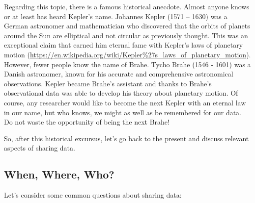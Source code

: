 \documentclass[
  11pt,
]{book}
\begin{document}
Regarding this topic, there is a famous historical anecdote. Almost anyone knows or at least has heard Kepler's name. Johannes Kepler (1571 -- 1630) was a German astronomer and mathematician who discovered that the orbits of planets around the Sun are elliptical and not circular as previously thought. This was an exceptional claim that earned him eternal fame with Kepler's laws of planetary motion (\url{https://en.wikipedia.org/wiki/Kepler\%27s_laws_of_planetary_motion}). However, fewer people know the name of Brahe. Tycho Brahe (1546 - 1601) was a Danish astronomer, known for his accurate and comprehensive astronomical observations. Kepler became Brahe's assistant and thanks to Brahe's observational data was able to develop his theory about planetary motion. Of course, any researcher would like to become the next Kepler with an eternal law in our name, but who knows, we might as well as be remembered for our data. Do not waste the opportunity of being the next Brahe!

So, after this historical excursus, let's go back to the present and discuss relevant aspects of sharing data.

\hypertarget{when-where-who}{%
\subsection{When, Where, Who?}\label{when-where-who}}

Let's consider some common questions about sharing data:
\end{document}
